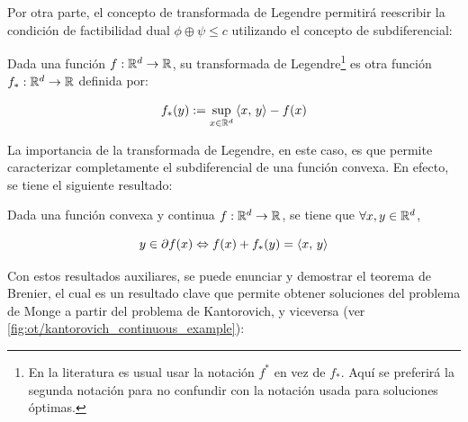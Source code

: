 
Por otra parte, el concepto de transformada de Legendre permitirá reescribir la condición de factibilidad dual $\phi\oplus\psi\leq c$ utilizando el concepto de subdiferencial:

\begin{defn}
	\label{defn:legendre}
	Dada una función $f:\mathbb{R}^d\to\mathbb{R}$, su transformada de Legendre\footnote{En la literatura es usual usar la notación $f^*$ en vez de $f_*$. Aquí se preferirá la segunda notación para no confundir con la notación usada para soluciones óptimas.} es otra función $f_*:\mathbb{R}^d\to\mathbb{R}$ definida por:

	\begin{equation*}
		f_*(y) := \sup_{x\in\mathbb{R}^d} \left\langle x,\,y\right\rangle - f(x)
	\end{equation*}
\end{defn}

La importancia de la transformada de Legendre, en este caso, es que permite caracterizar completamente el subdiferencial de una función convexa. En efecto, se tiene el siguiente resultado:

\begin{prop}
	\label{prop:subdiff_legendre}
	Dada una función convexa y continua $f:\mathbb{R}^d\to\mathbb{R}$, se tiene que $\forall x,y\in\mathbb{R}^d$,

	\begin{equation*}
		y\in\partial f(x) \Leftrightarrow f(x) + f_*(y) = \left\langle x,\,y\right\rangle
	\end{equation*}
\end{prop}

Con estos resultados auxiliares, se puede enunciar y demostrar el teorema de Brenier, el cual es un resultado clave que permite obtener soluciones del problema de Monge a partir del problema de Kantorovich, y viceversa (ver \autoref{fig:ot/kantorovich_continuous_example}):

